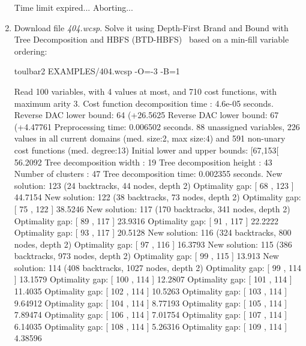 \begin{enumerate}
{\begin{DoxyCode}
Time limit expired... Aborting...
\end{DoxyCode}}
\item Download file {\em 404.wcsp}. Solve it using Depth-First Brand and Bound with Tree Decomposition and HBFS (BTD-HBFS)~\cite{Schiex06a} based on a min-fill variable ordering:
\begin{DoxyCode}
	toulbar2 EXAMPLES/404.wcsp -O=-3 -B=1
\end{DoxyCode}
{\scriptsize
\begin{DoxyCode}
Read 100 variables, with 4 values at most, and 710 cost functions, with maximum arity 3.
Cost function decomposition time : 4.6e-05 seconds.
Reverse DAC lower bound: 64 (+26.5625%
Reverse DAC lower bound: 67 (+4.47761%
Preprocessing time: 0.006502 seconds.
88 unassigned variables, 226 values in all current domains (med. size:2, max size:4) and 591 non-unary cost functions (med. degree:13)
Initial lower and upper bounds: [67,153[ 56.2092%
Tree decomposition width  : 19
Tree decomposition height : 43
Number of clusters        : 47
Tree decomposition time: 0.002355 seconds.
New solution: 123 (24 backtracks, 44 nodes, depth 2)
Optimality gap: [ 68 , 123 ] 44.7154 %
New solution: 122 (38 backtracks, 73 nodes, depth 2)
Optimality gap: [ 75 , 122 ] 38.5246 %
New solution: 117 (170 backtracks, 341 nodes, depth 2)
Optimality gap: [ 89 , 117 ] 23.9316 %
Optimality gap: [ 91 , 117 ] 22.2222 %
Optimality gap: [ 93 , 117 ] 20.5128 %
New solution: 116 (324 backtracks, 800 nodes, depth 2)
Optimality gap: [ 97 , 116 ] 16.3793 %
New solution: 115 (386 backtracks, 973 nodes, depth 2)
Optimality gap: [ 99 , 115 ] 13.913 %
New solution: 114 (408 backtracks, 1027 nodes, depth 2)
Optimality gap: [ 99 , 114 ] 13.1579 %
Optimality gap: [ 100 , 114 ] 12.2807 %
Optimality gap: [ 101 , 114 ] 11.4035 %
Optimality gap: [ 102 , 114 ] 10.5263 %
Optimality gap: [ 103 , 114 ] 9.64912 %
Optimality gap: [ 104 , 114 ] 8.77193 %
Optimality gap: [ 105 , 114 ] 7.89474 %
Optimality gap: [ 106 , 114 ] 7.01754 %
Optimality gap: [ 107 , 114 ] 6.14035 %
Optimality gap: [ 108 , 114 ] 5.26316 %
Optimality gap: [ 109 , 114 ] 4.38596 %

\end{DoxyCode}}
\end{enumerate}

